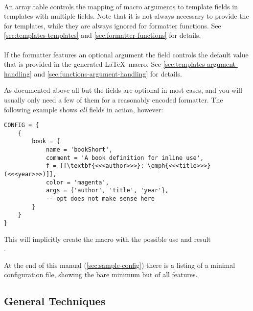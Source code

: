 \documentclass{scrartcl}
\begin{document}
\paragraph{}

An array table  controls the mapping of macro arguments to template
fields in templates with multiple fields.  Note that it is not always necessary
to provide the  for templates, while they are always ignored for
formatter functions. See \vref{sec:templates-templates} and
\vref{sec:formatter-functions} for details.


\paragraph{}

If the formatter features an optional argument the  field controls
the default value that is provided in the generated \LaTeX\ macro.  See
\vref{sec:templates-argument-handling} and
\vref{sec:functions-argument-handling} for details.

\bigskip

As documented above all but the  fields are optional in most cases,
and you will usually only need a few of them for a reasonably encoded formatter.
The following example shows \emph{all} fields in action, however:

\label{code:bookShort}
\begin{verbatim}
CONFIG = {
    {
        book = {
            name = 'bookShort',
            comment = 'A book definition for inline use',
            f = [[\textbf{<<<author>>>}: \emph{<<<title>>>} (<<<year>>>)]],
            color = 'magenta',
            args = {'author', 'title', 'year'},
            -- opt does not make sense here
        }
    }
}
\end{verbatim}

\noindent
This will implicitly create the macro  with the possible
use and result\\
.

\medskip

At the end of this manual (\vref{sec:sample-config}) there is a listing of a
minimal configuration file, showing the bare minimum but of all features.

\subsection{General Techniques}
\label{sec:general-techniques}
\end{document}
